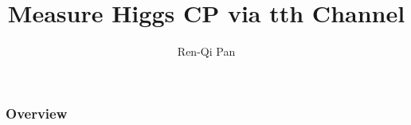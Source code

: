 \documentclass{beamer}
\title[tth]{Measure Higgs CP via tth Channel} %
\author{Ren-Qi Pan} %
\institute[ZJU] %
{
Zhejiang Institute of Modern Physics\\ %
\medskip
\textit{renqipan@zju.edu.cn} %
}
\begin{document}
\begin{frame}
\titlepage %
\end{frame}

\begin{frame}
\frametitle{Overview} %
\tableofcontents %
\end{frame}


\end{document}
